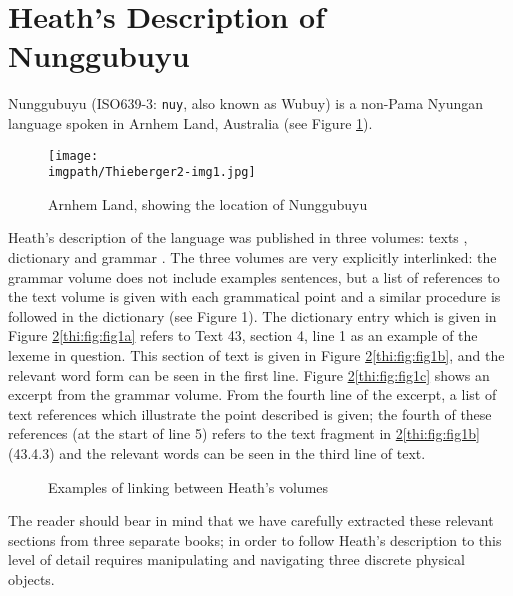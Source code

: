 \section{Heath's Description of Nunggubuyu}
Nunggubuyu (ISO639-3: \texttt{nuy}, also known as Wubuy) is a non-Pama Nyungan language spoken in Arnhem Land, Australia (see Figure \ref{thi:fig:map1}).

\begin{figure} 
\texttt{[image: \\imgpath/Thieberger2-img1.jpg]}
\caption{Arnhem Land, showing the location of Nunggubuyu} 
\label{thi:fig:map1}
\end{figure}

Heath's description of the language was published in three volumes: texts \citep{Heath1980}, dictionary \citep{Heath1982} and grammar \citep{Heath1984}. The three volumes are very explicitly interlinked: the grammar volume does not include examples sentences, but a list of references to the text volume is given with each grammatical point and a similar procedure is followed in the dictionary (see Figure 1). The dictionary entry which is given in Figure \ref{thi:fig:fig1}\ref{thi:fig:fig1a} refers to Text 43, section 4, line 1 as an example of the lexeme in question. This section of text is given in Figure \ref{thi:fig:fig1}\ref{thi:fig:fig1b}, and the relevant word form can be seen in the first line. Figure \ref{thi:fig:fig1}\ref{thi:fig:fig1c} shows an excerpt from the grammar volume. From the fourth line of the excerpt, a list of text references which illustrate the point described is given; the fourth of these references (at the start of line 5) refers to the text fragment in \ref{thi:fig:fig1}\ref{thi:fig:fig1b} (43.4.3) and the relevant words can be seen in the third line of text.

\begin{figure}  
\caption{Examples of linking between Heath's volumes} 
\label{thi:fig:fig1}
\end{figure}

The reader should bear in mind that we have carefully extracted these relevant sections from three separate books; in order to follow Heath's description to this level of detail requires manipulating and navigating three discrete physical objects.

